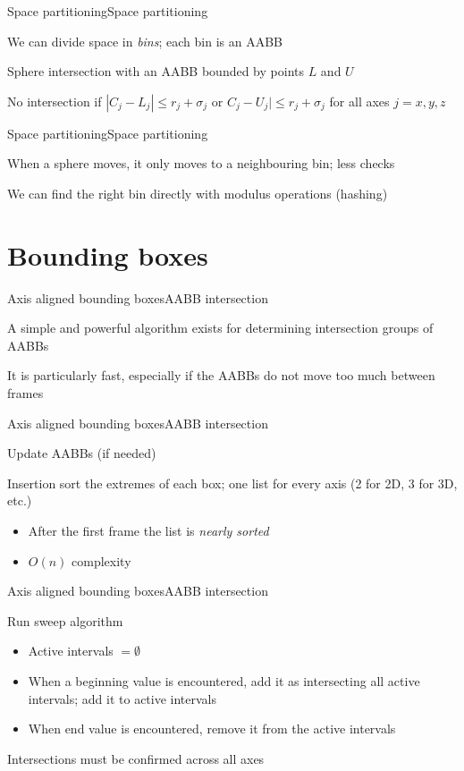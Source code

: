 \documentclass{beamer}
\begin{document}
\begin{slide}{Space partitioning}{Space partitioning}{
\item We can divide space in \textit{bins}; each bin is an AABB
\item Sphere intersection with an AABB bounded by points $L$ and $U$ 
\item No intersection if $|C_j - L_j| \leq r_j + \sigma_j$ or $C_j - U_j| \leq r_j + \sigma_j$ for all axes $j = x,y,z$
}\end{slide}

\begin{slide}{Space partitioning}{Space partitioning}{
\item When a sphere moves, it only moves to a neighbouring bin; less checks
\item We can find the right bin directly with modulus operations (hashing)
}\end{slide}

\section{Bounding boxes}
\begin{slide}{Axis aligned bounding boxes}{AABB intersection}{
\item A simple and powerful algorithm exists for determining intersection groups of AABBs
\item It is particularly fast, especially if the AABBs do not move too much between frames
}\end{slide}

\begin{slide}{Axis aligned bounding boxes}{AABB intersection}{
\item Update AABBs (if needed)
\item Insertion sort the extremes of each box; one list for every axis (2 for 2D, 3 for 3D, etc.)
\begin{itemize}
\item After the first frame the list is \textit{nearly sorted}
\item $O(n)$ complexity
\end{itemize}
}\end{slide}

\begin{slide}{Axis aligned bounding boxes}{AABB intersection}{
\item Run sweep algorithm
\begin{itemize}
\item Active intervals $= \emptyset$
\item When a beginning value is encountered, add it as intersecting all active intervals; add it to active intervals
\item When end value is encountered, remove it from the active intervals
\end{itemize}
\item Intersections must be confirmed across all axes
}\end{slide}
\end{document}
